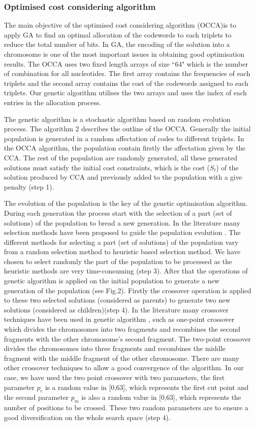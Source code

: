 \documentclass[twocolumn,12pt,a4paper]{article}
\begin{document}
\subsubsection{Optimised cost considering algorithm}
The main objective of the optimised cost considering algorithm (OCCA)is to apply GA to find an optimal allocation of the codewords to each triplets to reduce the total number of bits. In GA, the encoding of the solution into a chromosome is one of the most important issues in obtaining good optimisation results. The OCCA uses two fixed length arrays of size ``64" which is the number of combination for all nucleotides. The first array contains the frequencies of each triplets and the second array contains the cost of the codewords assigned to each triplets. Our genetic algorithm utilises the two arrays and uses the index of each entries in the allocation process.

The genetic algorithm is a stochastic algorithm based on random evolution process. The algorithm 2 describes the outline of the OCCA.   Generally the initial population is generated in a random affectation of codes to different triplets. In the OCCA algorithm, the population contain firstly the affectation given by the CCA. The rest of the population are randomly generated, all these generated solutions must satisfy the initial cost constraints, which is the cost ($S_t$) of the solution produced by CCA  and previously added to the population with a give penalty (step 1). 

The evolution of the population is the key of the genetic optimisation algorithm. During each generation the process start with the selection of a part (set of solutions) of the population to bread a new generation. In the literature many selection methods have been proposed to guide the population evolution \citep{bli95}. The different methods for selecting a part (set of solutions) of the population vary from a random selection method to heuristic based selection method. We have chosen to select randomly the part of the population to be processed as the heuristic methods are very time-consuming (step 3).
After that the operations of genetic algorithm is applied on the initial population to generate a new generation of the population (see Fig.2). Firstly the crossover operation is applied to these two selected solutions (considered as parents) to generate two new solutions (considered as children)(step 4). In the literature many crossover techniques have been used in genetic algorithm \citep{osa14}, such as one-point crossover which divides the chromosomes into two fragments and recombines the second fragments with the other chromosome's second fragment. The two-point crossover divides the chromosomes into three fragments and recombines the middle fragment with  the middle fragment of the other chromosome. There are many other crossover techniques to allow a good convergence of the algorithm. In our case, we have used the two point crossover with two parameters, the first parameter $p_{c}$ is a random value in [0,63], which represents the first cut point and the second parameter $p_{m}$ is also a random value in [0,63], which represents the number of positions to be crossed. These two random parameters are to ensure a good diversification on the whole search space (step 4).
\end{document}
